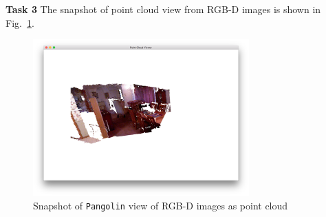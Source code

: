 \documentclass[12pt,a4paper]{article}
\begin{document}
    \textsf{\textbf{Task 3}}
    The snapshot of point cloud view from RGB-D images is shown in Fig.~\ref{fig:build_map}.
    \begin{figure}[!h]
        \centering
        \includegraphics[height=6cm]{fig/build_map.png}
        \caption{Snapshot of \texttt{Pangolin} view of RGB-D images as point cloud}
        \label{fig:build_map}
    \end{figure}

    
\end{document}

